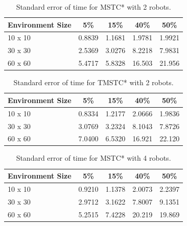 \begin{table}[H]
    \caption{Standard error of time for MSTC* with 2 robots.}
    \vspace{0.6em}
    \label{tab:time_mstcstar_2robots}
    \centering
    \small
    \setlength{\tabcolsep}{10pt}
    \renewcommand{\arraystretch}{1.3}
    \begin{tabular}{lcccc}
        \hline
        \textbf{Environment Size} & \textbf{5\%} & \textbf{15\%} & \textbf{40\%} & \textbf{50\%} \\
        \hline
        10 x 10 & 0.8839 & 1.1681 & 1.9781 & 1.9921 \\
        30 x 30 & 2.5369 & 3.0276 & 8.2218 & 7.9831 \\
        60 x 60 & 5.4717 & 5.8328 & 16.503 & 21.956 \\
        \hline
    \end{tabular}
\end{table}

\begin{table}[H]
    \caption{Standard error of time for TMSTC* with 2 robots.}
    \vspace{0.6em}
    \label{tab:time_tmstcstar_2robots}
    \centering
    \small
    \setlength{\tabcolsep}{10pt}
    \renewcommand{\arraystretch}{1.3}
    \begin{tabular}{lcccc}
        \hline
        \textbf{Environment Size} & \textbf{5\%} & \textbf{15\%} & \textbf{40\%} & \textbf{50\%} \\
        \hline
        10 x 10 & 0.8334 & 1.2177 & 2.0666 & 1.9836 \\
        30 x 30 & 3.0769 & 3.2324 & 8.1043 & 7.8726 \\
        60 x 60 & 7.0400 & 6.5320 & 16.921 & 22.120 \\
        \hline
    \end{tabular}
\end{table}

\begin{table}[H]
    \caption{Standard error of time for MSTC* with 4 robots.}
    \vspace{0.6em}
    \label{tab:time_mstcstar_4robots}
    \centering
    \small
    \setlength{\tabcolsep}{10pt}
    \renewcommand{\arraystretch}{1.3}
    \begin{tabular}{lcccc}
        \hline
        \textbf{Environment Size} & \textbf{5\%} & \textbf{15\%} & \textbf{40\%} & \textbf{50\%} \\
        \hline
        10 x 10 & 0.9210 & 1.1378 & 2.0073 & 2.2397 \\
        30 x 30 & 2.9712 & 3.1622 & 7.8007 & 9.1351 \\
        60 x 60 & 5.2515 & 7.4228 & 20.219 & 19.869 \\
        \hline
    \end{tabular}
\end{table}


